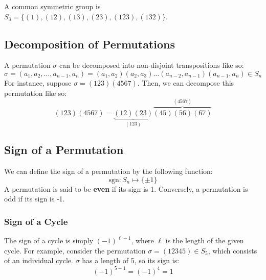 \documentclass[letterpaper]{article}
\begin{document}
\bigskip 

A common symmetric group is $S_3 = \{(1), (12), (13), (23), (123), (132)\}$. 

\subsection{Decomposition of Permutations}
A permutation $\sigma$ can be decomposed into non-disjoint transpositions like so: 
\[\sigma = (a_1, a_2, \dots, a_{n - 1}, a_n) = (a_1, a_2)(a_2, a_3) \dots (a_{n - 2}, a_{n - 1})(a_{n - 1}, a_n) \in S_n\]
For instance, suppose $\sigma = (123)(4567)$. Then, we can decompose this permutation like so: 
\[(123)(4567) = \underbrace{(12)(23)}_{(123)}\overbrace{(45)(56)(67)}^{(4567)}\]

\subsection{Sign of a Permutation}
We can define the sign of a permutation by the following function: 
\[\text{sgn}: S_n \mapsto \{\pm1\}\]
A permutation is said to be \textbf{even} if its sign is 1. Conversely, a permutation is odd if its sign is -1. 

\subsubsection{Sign of a Cycle}
The sign of a cycle is simply $(-1)^{\ell - 1}$, where $\ell$ is the length of the given cycle. For example, consider the permutation $\sigma = (12345) \in S_5$, which consists of an individual cycle. $\sigma$ has a length of 5, so its sign is:
\[(-1)^{5 - 1} = (-1)^4 = 1\] 
\end{document}
